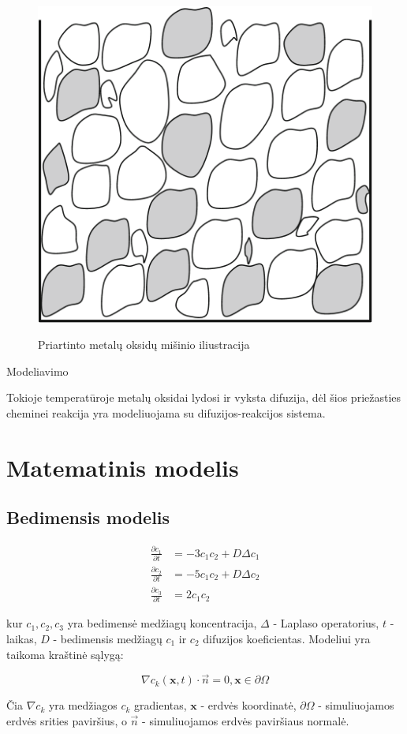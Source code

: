 \documentclass{VUMIFInfKursinis}
\begin{document}
\begin{figure}[h]
  \centering
  \includegraphics[width=0.25\linewidth]{assets/metal_oxides_mixture.png}
  \label{fig:metal-oxides-mixuter}
  \caption{Priartinto metalų oksidų mišinio iliustracija \cite{}}
\end{figure}

Modeliavimo 

Tokioje temperatūroje metalų oksidai lydosi ir vyksta difuzija, dėl šios priežasties cheminei reakcija yra modeliuojama su difuzijos-reakcijos sistema.

\section{Matematinis modelis}

\subsection{Bedimensis modelis}

\begin{subequations} \label{nodim}
    \begin{align}
    \frac{\partial c_1}{\partial t}&=-3c_1c_2+D\Delta c_1 \label{nodim1}\\
    \frac{\partial c_2}{\partial t}&=-5c_1c_2+D\Delta c_2 \label{nodim2}\\
    \frac{\partial c_3}{\partial t}&=2c_1c_2
    \end{align}
\end{subequations}

kur $c_1,c_2,c_3$ yra bedimensė medžiagų koncentracija, 
$\Delta$ - Laplaso operatorius, $t$ - laikas, 
$D$ - bedimensis medžiagų $c_1$ ir $c_2$ difuzijos koeficientas. Modeliui yra taikoma kraštinė sąlygą:

\begin{equation} \label{general-boundary-cond}
  \nabla c_k(\textbf{x}, t)\cdot\vec{n}=0, \textbf{x}\in\partial\Omega
\end{equation}

Čia $\nabla c_k$ yra medžiagos $c_k$ gradientas, $\textbf{x}$ - erdvės koordinatė, $\partial\Omega$ - simuliuojamos erdvės srities paviršius, o $\vec{n}$ - simuliuojamos erdvės paviršiaus normalė.
\end{document}
